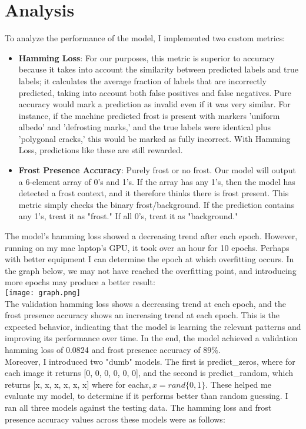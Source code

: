 \documentclass[11pt]{article}
\begin{document}
\section{Analysis}
To analyze the performance of the model, I implemented two custom metrics:
\begin{itemize}
    \item \textbf{Hamming Loss}: For our purposes, this metric is superior to accuracy because it takes into account the similarity between predicted labels and true labels; it calculates the average fraction of labels that are incorrectly predicted, taking into account both false positives and false negatives. Pure accuracy would mark a prediction as invalid even if it was very similar. For instance, if the machine predicted frost is present with markers 'uniform albedo' and 'defrosting marks,' and the true labels were identical plus 'polygonal cracks,' this would be marked as fully incorrect. With Hamming Loss, predictions like these are still rewarded.
    \item \textbf{Frost Presence Accuracy}: Purely frost or no frost. Our model will output a 6-element array of 0's and 1's. If the array has any 1's, then the model has detected a frost context, and it therefore thinks there is frost present. This metric simply checks the binary frost/background. If the prediction contains any 1's, treat it as "frost." If all 0's, treat it as "background."
\end{itemize}
The model's hamming loss showed a decreasing trend after each epoch. However, running on my mac laptop's GPU, it took over an hour for 10 epochs. Perhaps with better equipment I can determine the epoch at which overfitting occurs. In the graph below, we may not have reached the overfitting point, and introducing more epochs may produce a better result:\\
\texttt{[image: graph.png]}
\\
The validation hamming loss shows a decreasing trend at each epoch, and the frost presence accuracy shows an increasing trend at each epoch. This is the expected behavior, indicating that the model is learning the relevant patterns and improving its performance over time. In the end, the model achieved a validation hamming loss of 0.0824 and frost presence accuracy of $89\%$.
\\
Moreover, I introduced two "dumb" models. The first is predict\_zeros, where for each image it returns [0, 0, 0, 0, 0, 0], and the second is predict\_random, which returns [x, x, x, x, x, x] where for each$x, x = rand\{0,1\}$. These helped me evaluate my model, to determine if it performs better than random guessing. I ran all three models against the testing data. The hamming loss and frost presence accuracy values across these models were as follows:\\\\
\end{document}
